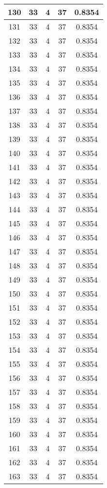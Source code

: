 \documentclass[letterpaper, 12pt]{article}
\begin{document}
\begin{longtable}{|c|c|c|c|c|}
130 & 33 & 4 & 37 & 0.8354 \\
\hline
131 & 33 & 4 & 37 & 0.8354 \\
\hline
132 & 33 & 4 & 37 & 0.8354 \\
\hline
133 & 33 & 4 & 37 & 0.8354 \\
\hline
134 & 33 & 4 & 37 & 0.8354 \\
\hline
135 & 33 & 4 & 37 & 0.8354 \\
\hline
136 & 33 & 4 & 37 & 0.8354 \\
\hline
137 & 33 & 4 & 37 & 0.8354 \\
\hline
138 & 33 & 4 & 37 & 0.8354 \\
\hline
139 & 33 & 4 & 37 & 0.8354 \\
\hline
140 & 33 & 4 & 37 & 0.8354 \\
\hline
141 & 33 & 4 & 37 & 0.8354 \\
\hline
142 & 33 & 4 & 37 & 0.8354 \\
\hline
143 & 33 & 4 & 37 & 0.8354 \\
\hline
144 & 33 & 4 & 37 & 0.8354 \\
\hline
145 & 33 & 4 & 37 & 0.8354 \\
\hline
146 & 33 & 4 & 37 & 0.8354 \\
\hline
147 & 33 & 4 & 37 & 0.8354 \\
\hline
148 & 33 & 4 & 37 & 0.8354 \\
\hline
149 & 33 & 4 & 37 & 0.8354 \\
\hline
150 & 33 & 4 & 37 & 0.8354 \\
\hline
151 & 33 & 4 & 37 & 0.8354 \\
\hline
152 & 33 & 4 & 37 & 0.8354 \\
\hline
153 & 33 & 4 & 37 & 0.8354 \\
\hline
154 & 33 & 4 & 37 & 0.8354 \\
\hline
155 & 33 & 4 & 37 & 0.8354 \\
\hline
156 & 33 & 4 & 37 & 0.8354 \\
\hline
157 & 33 & 4 & 37 & 0.8354 \\
\hline
158 & 33 & 4 & 37 & 0.8354 \\
\hline
159 & 33 & 4 & 37 & 0.8354 \\
\hline
160 & 33 & 4 & 37 & 0.8354 \\
\hline
161 & 33 & 4 & 37 & 0.8354 \\
\hline
162 & 33 & 4 & 37 & 0.8354 \\
\hline
163 & 33 & 4 & 37 & 0.8354 \\

\end{longtable}
\end{document}
